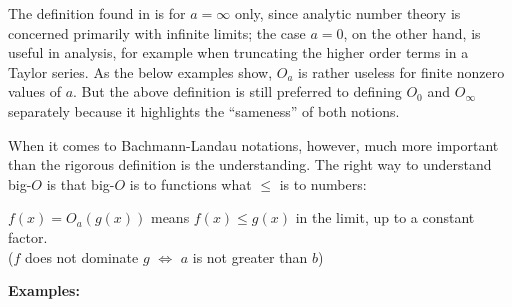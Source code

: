 \documentclass{article}
\theoremstyle{definition}
\begin{document}
The definition found in \cite{Landau1909} is for \(a=\infty\) only, since analytic number theory is concerned primarily with infinite limits; the case \(a = 0\), on the other hand, is useful in analysis, for example when truncating the higher order terms in a Taylor series.
As the below examples show, \(O_a\) is rather useless for finite nonzero values of \(a\).
But the above definition is still preferred to defining \(O_0\) and \(O_{\infty}\) separately because it highlights the ``sameness'' of both notions.

When it comes to Bachmann-Landau notations, however, much more important than the rigorous definition is the understanding.
The right way to understand big-$O$ is that big-$O$ is to functions what \(\le\) is to numbers:
\begin{center}
    \(f(x) = O_a(g(x))\) means \(f(x) \le g(x)\) in the limit, up to a constant factor. \\
    (\(f\) does not dominate \(g\) \(\iff\) \(a\) is not greater than \(b\))
\end{center}

\textbf{Examples:}
\end{document}
